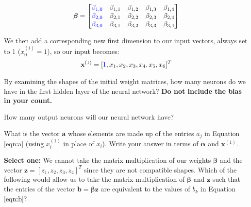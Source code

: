 \documentclass[11pt,addpoints,answers]{exam}
\newcommand{\av}{\mathbf{a}}
\newcommand{\bv}{\mathbf{b}}
\newcommand{\xv}{\mathbf{x}}
\newcommand{\zv}{\mathbf{z}}
\newcommand{\betav      }{\boldsymbol \beta      }
\begin{document}
\begin{questions}
\begin{parts}
$$\boldsymbol{\beta}=
    \begin{bmatrix}
    \textcolor{blue}{\beta_{1,0}} & \beta_{1,1} & \beta_{1,2} & \beta_{1,3} & \beta_{1,4} \\
    \textcolor{blue}{\beta_{2,0}} & \beta_{2,1} & \beta_{2,2} & \beta_{2,3} & \beta_{2,4} \\
    \textcolor{blue}{\beta_{3,0}} & \beta_{3,1} & \beta_{3,2} & \beta_{3,3} & \beta_{3,4}
    \end{bmatrix}$$

    We then add a corresponding new first dimension to our input vectors, always set to 1 ($x_0^{(i)} = 1$), so our input becomes: $$\xv^{(1)}=[\textcolor{blue}{1},x_1,x_2,x_3,x_4,x_5,x_6]^T$$
    
    
    \begin{subparts}
        \subpart[1] By examining the shapes of the initial weight matrices, how many neurons do we have in the first hidden layer of the neural network? \textbf{Do not include the bias in your count.}
        
        \begin{your_solution}[title=Answer,height=2cm,width=4cm]
        \end{your_solution}

        \subpart[1] How many output neurons will our neural network have?
        
        \begin{your_solution}[title=Answer,height=2cm,width=4cm]
        \end{your_solution}

        \subpart[1] What is the vector $\av$ whose elements are made up of the entries $a_j$ in Equation \ref{eqn:a} (using $x^{(1)}_i$ in place of $x_i$). Write your answer in terms of $\bm{\alpha}$ and $\xv^{(1)}$.
        
        \begin{your_solution}[title=Answer,height=2cm,width=4cm]
        \end{your_solution}
        

        \clearpage

        \subpart[1] \textbf{Select one:} We cannot take the matrix multiplication of our weights $\betav$ and the vector $\zv = [z_1, z_2, z_3, z_4]^T$ since they are not compatible shapes. Which of the following would allow us to take the matrix multiplication of $\betav$ and $\zv$ such that the entries of the vector $\bv = \boldsymbol{\beta}\zv$ are equivalent to the values of $b_k$ in Equation \ref{eqn:b}? 
        

\end{subparts}
\end{parts}
\end{questions}
\end{document}
